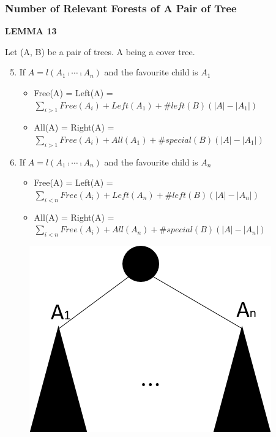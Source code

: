 \documentclass{beamer}
\begin{document}
\begin{frame}
\frametitle{Number of Relevant Forests of A Pair of Tree}
\textbf{LEMMA 13}

Let (A, B) be a pair of trees. A being a cover tree.

\begin{enumerate}[1)]
\setcounter{enumi}{4}
\item If $A=l(A_1 \comp \cdots \comp A_n)$ and the favourite child is $A_1$
\begin{itemize}
\item Free(A) = Left(A) = $\sum_{i>1}Free(A_i) + Left(A_1) + \#left(B)(\left\vert A \right\vert - \left\vert A_1 \right\vert)$
\item All(A) = Right(A) = $\sum_{i>1}Free(A_i) + All(A_1) + \#special(B)(\left\vert A \right\vert - \left\vert A_1 \right\vert)$
\end{itemize}
\item If $A=l(A_1 \comp \cdots \comp A_n)$ and the favourite child is $A_n$
\begin{itemize}
\item Free(A) = Left(A) = $\sum_{i<n}Free(A_i) + Left(A_n) + \#left(B)(\left\vert A \right\vert - \left\vert A_n \right\vert)$
\item All(A) = Right(A) = $\sum_{i<n}Free(A_i) + All(A_n) + \#special(B)(\left\vert A \right\vert - \left\vert A_n \right\vert)$
\end{itemize}
\end{enumerate}


\begin{figure}
	\includegraphics[width=0.4\linewidth]{lemma132}
	\label{LEMMA 13(2)} 
	\centering
\end{figure}
\end{frame}
\end{document}
